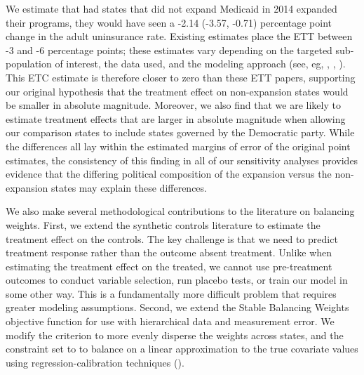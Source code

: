 \documentclass[12pt]{article}
\begin{document}
We estimate that had states that did not expand Medicaid in 2014 expanded their programs, they would have seen a -2.14 (-3.57, -0.71) percentage point change in the adult uninsurance rate. Existing estimates place the ETT between -3 and -6 percentage points; these estimates vary depending on the targeted sub-population of interest, the data used, and the modeling approach (see, eg, \cite{courtemanche2017early}, \cite{kaestner2017effects}, \cite{frean2017premium}). This ETC estimate is therefore closer to zero than these ETT papers, supporting our original hypothesis that the treatment effect on non-expansion states would be smaller in absolute magnitude. Moreover, we also find that we are likely to estimate treatment effects that are larger in absolute magnitude when allowing our comparison states to include states governed by the Democratic party. While the differences all lay within the estimated margins of error of the original point estimates, the consistency of this finding in all of our sensitivity analyses provides evidence that the differing political composition of the expansion versus the non-expansion states may explain these differences. 

We also make several methodological contributions to the literature on balancing weights. First, we extend the synthetic controls literature to estimate the treatment effect on the controls. The key challenge is that we need to predict treatment response rather than the outcome absent treatment. Unlike when estimating the treatment effect on the treated, we cannot use pre-treatment outcomes to conduct variable selection, run placebo tests, or train our model in some other way. This is a fundamentally more difficult problem that requires greater modeling assumptions. Second, we extend the Stable Balancing Weights objective function for use with hierarchical data and measurement error. We modify the criterion to more evenly disperse the weights across states, and the constraint set to to balance on a linear approximation to the true covariate values using regression-calibration techniques (\cite{gleser1992importance}).
\end{document}
